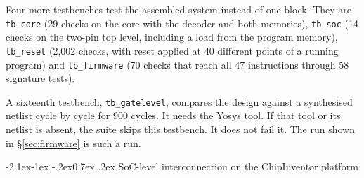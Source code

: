 \documentclass[11pt,a4paper]{article}
\makeatletter
\renewcommand\subsection{\@startsection{subsection}{2}{\z@}%
  {-2.1ex\@plus -1ex \@minus -.2ex}{0.7ex \@plus .2ex}%
  {\color{rvbldark}\normalfont\normalsize\bfseries}}
\makeatother
\begin{document}
\vspace{4pt}
Four more testbenches test the assembled system instead of one block. They are
\texttt{tb\_core} (29 checks on the core with the decoder and both memories),
\texttt{tb\_soc} (14 checks on the two-pin top level, including a load from the program
memory), \texttt{tb\_reset} (2{,}002 checks, with reset applied at 40 different points of a
running program) and \texttt{tb\_firmware} (70 checks that reach all 47 instructions through
58 signature tests).

A sixteenth testbench, \texttt{tb\_gatelevel}, compares the design against a synthesised
netlist cycle by cycle for 900 cycles. It needs the Yosys tool. If that tool or its netlist
is absent, the suite skips this testbench. It does not fail it. The run shown in
\S\ref{sec:firmware} is such a run.

\subsection{SoC-level interconnection on the ChipInventor platform}
\label{sec:canvas}
\end{document}
